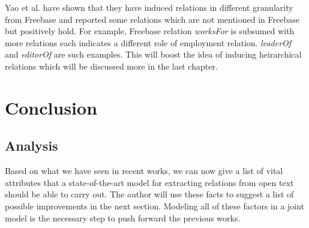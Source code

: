 \documentclass[12pt]{report}
\begin{document}
 Yao et al. have shown that they have induced relations in different granularity from Freebase and reported some relations
 which are not mentioned in Freebase but positively hold. For example, Freebase relation \emph{worksFor}
  is subsumed with more relations each indicates a different role of employment relation. \emph{leaderOf}
   and \emph{editorOf} are such examples. This will boost the idea of inducing heirarchical 
   relations which will be discussed more in the last chapter.
 
 

\chapter{Conclusion}
\label{ch:conclusion}

\section{Analysis}
\label{ch:conclusion}

Based on what we have seen in recent works, we can now give a list of vital
attributes that a state-of-the-art model for extracting relations from open text
should be able to carry out. The author will use these facts to suggest a list of possible improvements
in the next section. Modeling all of
these factors in a joint model is the necessary step to push forward the previous
works.
\end{document}
